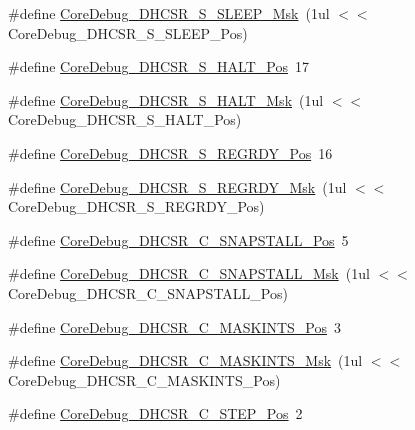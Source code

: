 \begin{DoxyCompactItemize}
\item 
\#define \hyperlink{group___c_m_s_i_s___c_m3___core_debug_ga98d51538e645c2c1a422279cd85a0a25}{Core\-Debug\-\_\-\-D\-H\-C\-S\-R\-\_\-\-S\-\_\-\-S\-L\-E\-E\-P\-\_\-\-Msk}~(1ul $<$$<$ Core\-Debug\-\_\-\-D\-H\-C\-S\-R\-\_\-\-S\-\_\-\-S\-L\-E\-E\-P\-\_\-\-Pos)
\item 
\#define \hyperlink{group___c_m_s_i_s___c_m3___core_debug_ga760a9a0d7f39951dc3f07d01f1f64772}{Core\-Debug\-\_\-\-D\-H\-C\-S\-R\-\_\-\-S\-\_\-\-H\-A\-L\-T\-\_\-\-Pos}~17
\item 
\#define \hyperlink{group___c_m_s_i_s___c_m3___core_debug_ga9f881ade3151a73bc5b02b73fe6473ca}{Core\-Debug\-\_\-\-D\-H\-C\-S\-R\-\_\-\-S\-\_\-\-H\-A\-L\-T\-\_\-\-Msk}~(1ul $<$$<$ Core\-Debug\-\_\-\-D\-H\-C\-S\-R\-\_\-\-S\-\_\-\-H\-A\-L\-T\-\_\-\-Pos)
\item 
\#define \hyperlink{group___c_m_s_i_s___c_m3___core_debug_ga20a71871ca8768019c51168c70c3f41d}{Core\-Debug\-\_\-\-D\-H\-C\-S\-R\-\_\-\-S\-\_\-\-R\-E\-G\-R\-D\-Y\-\_\-\-Pos}~16
\item 
\#define \hyperlink{group___c_m_s_i_s___c_m3___core_debug_gac4cd6f3178de48f473d8903e8c847c07}{Core\-Debug\-\_\-\-D\-H\-C\-S\-R\-\_\-\-S\-\_\-\-R\-E\-G\-R\-D\-Y\-\_\-\-Msk}~(1ul $<$$<$ Core\-Debug\-\_\-\-D\-H\-C\-S\-R\-\_\-\-S\-\_\-\-R\-E\-G\-R\-D\-Y\-\_\-\-Pos)
\item 
\#define \hyperlink{group___c_m_s_i_s___c_m3___core_debug_ga85747214e2656df6b05ec72e4d22bd6d}{Core\-Debug\-\_\-\-D\-H\-C\-S\-R\-\_\-\-C\-\_\-\-S\-N\-A\-P\-S\-T\-A\-L\-L\-\_\-\-Pos}~5
\item 
\#define \hyperlink{group___c_m_s_i_s___c_m3___core_debug_ga53aa99b2e39a67622f3b9973e079c2b4}{Core\-Debug\-\_\-\-D\-H\-C\-S\-R\-\_\-\-C\-\_\-\-S\-N\-A\-P\-S\-T\-A\-L\-L\-\_\-\-Msk}~(1ul $<$$<$ Core\-Debug\-\_\-\-D\-H\-C\-S\-R\-\_\-\-C\-\_\-\-S\-N\-A\-P\-S\-T\-A\-L\-L\-\_\-\-Pos)
\item 
\#define \hyperlink{group___c_m_s_i_s___c_m3___core_debug_ga0d2907400eb948a4ea3886ca083ec8e3}{Core\-Debug\-\_\-\-D\-H\-C\-S\-R\-\_\-\-C\-\_\-\-M\-A\-S\-K\-I\-N\-T\-S\-\_\-\-Pos}~3
\item 
\#define \hyperlink{group___c_m_s_i_s___c_m3___core_debug_ga77fe1ef3c4a729c1c82fb62a94a51c31}{Core\-Debug\-\_\-\-D\-H\-C\-S\-R\-\_\-\-C\-\_\-\-M\-A\-S\-K\-I\-N\-T\-S\-\_\-\-Msk}~(1ul $<$$<$ Core\-Debug\-\_\-\-D\-H\-C\-S\-R\-\_\-\-C\-\_\-\-M\-A\-S\-K\-I\-N\-T\-S\-\_\-\-Pos)
\item 
\#define \hyperlink{group___c_m_s_i_s___c_m3___core_debug_gae1fc39e80de54c0339cbb1b298a9f0f9}{Core\-Debug\-\_\-\-D\-H\-C\-S\-R\-\_\-\-C\-\_\-\-S\-T\-E\-P\-\_\-\-Pos}~2
$$
\end{DoxyCompactItemize}
